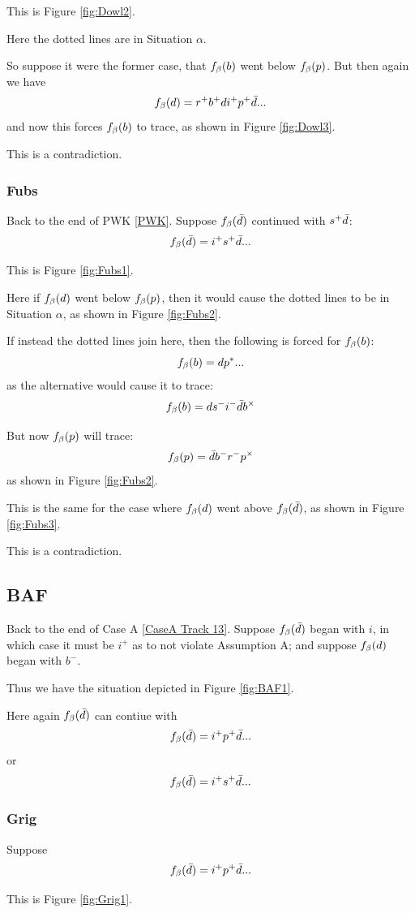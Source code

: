 This is Figure \ref{fig:Dowl2}.

Here the dotted lines are in Situation $\alpha$. 

So suppose it were the former case, that $f_\beta(b)$ went below $f_\beta(p)$. But then again we have
\[
f_\beta(d) = r^+ b^+ d i^+ p^+ \bar{d}...
\]
and now this forces $f_\beta(b)$ to trace, as shown in Figure \ref{fig:Dowl3}.

This is a contradiction.

\subsubsection{Fubs}\label{Fubs}
Back to the end of PWK \ref{PWK}. Suppose $f_\beta(\bar{d})$ continued with $s^+ \bar{d}$:
\[
f_\beta(\bar{d}) = i^+ s^+ \bar{d}...
\]

This is Figure \ref{fig:Fubs1}.

Here if $f_\beta(d)$ went below $f_\beta(p)$, then it would cause the dotted lines to be in Situation $\alpha$, as shown in Figure \ref{fig:Fubs2}.

If instead the dotted lines join here, then the following is forced for $f_\beta(b)$:
\[
f_\beta(b) = d p^*...
\]
as the alternative would cause it to trace:
\[
f_\beta(b) = d s^- i^- \bar{d} b^\times
\]

But now $f_\beta(p)$ will trace:
\[
f_\beta(p) = \bar{d} b^- r^- p^\times
\]
as shown in Figure \ref{fig:Fubs2}.

This is the same for the case where $f_\beta(d)$ went above $f_\beta(\bar{d})$, as shown in Figure \ref{fig:Fubs3}.

This is a contradiction.

\subsection{BAF}\label{BAF}
Back to the end of Case A \ref{CaseA Track 13}. Suppose $f_\beta(\bar{d})$ began with $i$, in which case it must be $i^+$ as to not violate Assumption A; and suppose $f_\beta(d)$ began with $b^-$.

Thus we have the situation depicted in Figure \ref{fig:BAF1}.

Here again $f_\beta(\bar{d})$ can contiue with
\[
f_\beta(\bar{d}) = i^+ p^+ \bar{d}...
\]
or
\[
f_\beta(\bar{d}) = i^+ s^+ \bar{d}...
\]

\subsubsection{Grig}\label{Grig}
Suppose
\[
f_\beta(\bar{d}) = i^+ p^+ \bar{d}...
\]

This is Figure \ref{fig:Grig1}.

